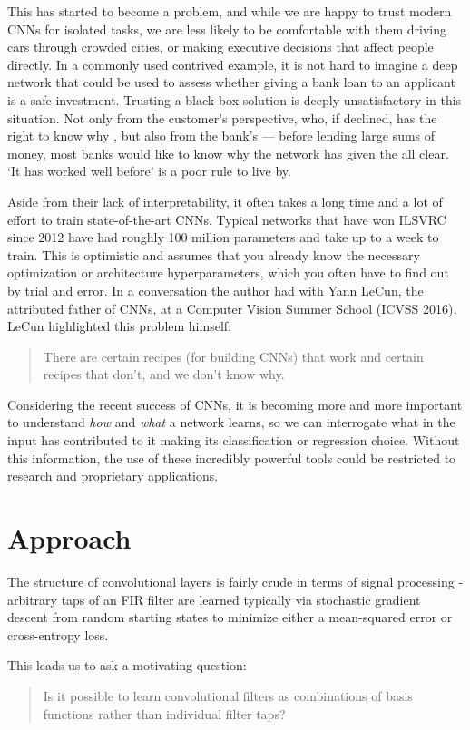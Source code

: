 This has started to become a problem, and while we are happy to trust modern
CNNs for isolated tasks, we are less likely to be comfortable with them driving
cars through crowded cities, or making executive decisions that affect people
directly. In a commonly used contrived example, it is not hard to imagine a deep
network that could be used to assess whether giving a bank loan to an applicant
is a safe investment. Trusting a black box solution is deeply unsatisfactory in
this situation. Not only from the customer's perspective, who, if declined, has
the right to know why \cite{goodman_european_2017-1}, but
also from the bank's --- before lending large sums of money, most banks
would like to know why the network has given the all clear. `It has worked well
before' is a poor rule to live by.

Aside from their lack of interpretability, it often takes a long time and a lot of
effort to train state-of-the-art CNNs. Typical networks that have won ILSVRC
since 2012 have had roughly 100 million parameters and take up to a week to train. This
is optimistic and assumes that you already know the necessary optimization or
architecture hyperparameters, which you often have to find out by trial and error.
In a conversation the author had with Yann LeCun, the attributed father of
CNNs, at a Computer Vision Summer School (ICVSS 2016), LeCun highlighted this problem
himself:
\begin{quote}
  There are certain recipes (for building CNNs) that work and certain recipes
  that don't, and we don't know why.
\end{quote}

Considering the recent success of CNNs, it is becoming more and more
important to understand \emph{how} and \emph{what} a network learns, so we can
interrogate what in the input has contributed to it making its classification or regression choice.
Without this information, the use of these incredibly powerful tools could be
restricted to research and proprietary applications.

\section{Approach}
The structure of convolutional layers is fairly crude in terms of signal
processing - arbitrary taps of an FIR filter are learned typically via
stochastic gradient descent from random starting states to minimize either a
mean-squared error or cross-entropy loss.

This leads us to ask a motivating question:
%
\begin{quote}
  Is it possible to learn convolutional filters as combinations of basis
  functions rather than individual filter taps?
\end{quote}

